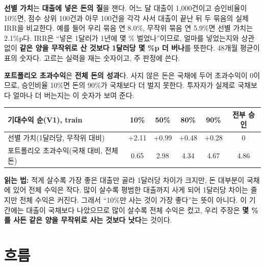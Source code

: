 \begin{formulabox}
\textbf{선별 가치}는 \textbf{대출에 넣은 돈의 질}을 잰다. 어느 달 대출이 1,000건이고 승인비율이 10\%면, 점수 상위 100건과 아무 100건을 각각 사서 대출이 끝난 뒤 두 묶음의 실제 IRR을 비교한다. 예를 들어 우리 묶음 연 8.0\%, 무작위 묶음 연 5.9\%면 선별 가치는 2.1\%p다. IRR은 ``넣은 1달러가 1년에 몇 \% 벌었나''이므로, 얼마를 넣었는지와 상관없이 \textbf{같은 양을 무작위로 산 것보다 1달러당 몇 \%p 더 버나}를 뜻한다. 48개월 평균이 표의 숫자다. 고르는 실력을 재는 숫자이고, 주 판정에 쓴다.

\textbf{포트폴리오 초과수익}은 \textbf{전체 돈의 성과}다. 사지 않은 돈은 국채에 두어 초과수익이 0이므로, 승인비율 10\%면 돈의 90\%가 국채보다 더 벌지 못한다. 투자자가 실제로 국채보다 얼마나 더 버는지는 이 숫자가 보여 준다.

\smallskip
\centering\small
\begin{tabular}{@{}lccccc@{}}\toprule
기대수익 순(V1), train & 10\% & 50\% & 80\% & 90\% & 전부 승인\\\midrule
선별 가치(1달러당, 무작위 대비) & +2.11 & +0.99 & +0.48 & +0.28 & 0\\
포트폴리오 초과수익(국채 대비, 전체 돈) & 0.65 & 2.98 & 4.34 & 4.67 & 4.86\\\bottomrule
\end{tabular}

\raggedright
\smallskip
\textbf{읽는 법:} 적게 살수록 가장 좋은 대출만 골라 1달러당 차이가 크지만, 돈 대부분이 국채에 있어 전체 수익은 작다. 많이 살수록 평범한 대출까지 사게 되어 1달러당 차이는 줄지만 전체 수익은 커진다. 그래서 ``10\%만 사는 것이 가장 좋다''는 뜻이 아니다. 이 기간에는 대출이 국채보다 나았으므로 많이 살수록 전체 수익은 컸고, 우리 주장은 \textbf{몇 \%를 사든 같은 양을 무작위로 사는 것보다 낫다}는 것이다.
\end{formulabox}


\section*{흐름}


